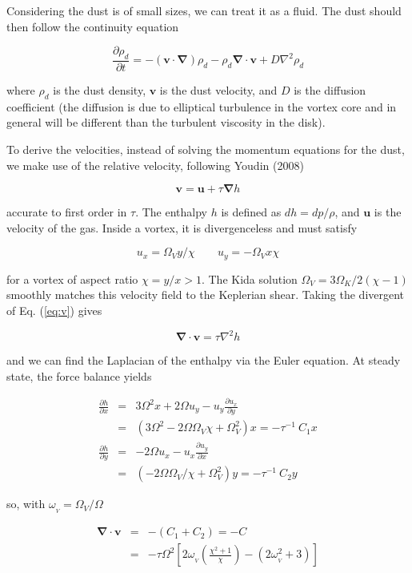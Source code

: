 \documentclass[apj]{emulateapj}
\newcommand{\pderiv}[2]{\frac{\partial #1}{\partial #2}}
\renewcommand{\v}[1]{{\boldsymbol{#1}}} %
\newcommand{\del}{\v{\nabla}}
\newcommand{\grad}{\del}
\newcommand{\Div}{\del\cdot}
\newcommand{\Laplace}{\nabla^2}
\newcommand{\Eq}[1]{Eq. (\ref{#1})}
\newcommand{\eq}[1]{\Eq{#1}}
\newcommand{\beq}{\begin{equation}}
\newcommand{\eeq}{\end{equation}}
\newcommand{\beqn}{\begin{eqnarray}}
\newcommand{\eeqn}{\end{eqnarray}}
\begin{document}
Considering the dust is of small sizes, we can treat it as a
fluid. The dust should then follow the continuity equation 

\beq
  \pderiv{\rho_d}{t} = -(\v{v}\cdot\del)\rho_d - \rho_d \Div{\v{v}} + D\Laplace{\rho_d}
\eeq

\noindent where $\rho_d$ is the dust density, $\v{v}$ is the dust
velocity, and $D$ is the diffusion coefficient (the diffusion is due
to elliptical turbulence in the vortex core and in general will be
different than the turbulent viscosity in the disk). 

To derive the velocities, instead of solving the momentum equations
for the dust, we make use of the relative velocity, following Youdin
(2008)  

\beq
\v{v} = \v{u} + \tau  \grad{h} 
\label{eq:v}
\eeq

\noindent accurate to first order in $\tau$. The enthalpy $h$ is defined 
as $dh = dp /\rho$, and  $\v{u}$ is the velocity of the gas. Inside a vortex, it is
divergenceless and must satisfy 

\beq
  u_x = \varOmega_V y / \chi \qquad  u_y= -\varOmega_V x \chi
\eeq

\noindent for a vortex of aspect ratio $\chi= y/x > 1$. The Kida
solution $\varOmega_V = 3\Omega_K/2(\chi-1)$ smoothly matches 
this velocity field to the Keplerian shear. Taking the divergent of
\eq{eq:v} gives 

\beq
\Div{\v{v}} = \tau \Laplace{h} 
\label{eq:divv}
\eeq

\noindent and we can find the Laplacian of the enthalpy via the Euler
equation. At steady state, the force balance yields 

\begin{eqnarray}
\pderiv{h}{x} &=& 3\varOmega^2 x + 2\varOmega u_y -
u_y\pderiv{u_x}{y} \nonumber \\
&=& \left(3\varOmega^2 - 2\Omega\Omega_V \chi + \varOmega_V^2\right) x
= -\tau^{-1} \ C_1 x  \\
\pderiv{h}{y} &=& - 2\varOmega u_x -
u_x\pderiv{u_y}{x} \nonumber \\
&=& \left(-2\Omega\Omega_V/\chi + \Omega_V^2\right) y = -\tau^{-1} \ C_2 y
\end{eqnarray}

\noindent  so, with $\omega_{_V}=\varOmega_V/\varOmega$

\beqn
\Div{\v{v}} &=& -(C_1+C_2) = - C\\
&=& - \tau\varOmega^2 \left[2\omega_{_V}\left(\frac{\chi^2+1}{\chi}\right) - (2\omega_{_V}^2 + 3) \right]
\eeqn
\end{document}
